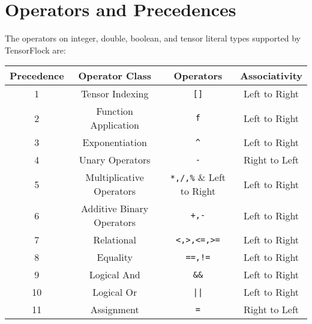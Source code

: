 \section{Operators and Precedences}%
\label{sec:operators_and_precedences}

The operators on integer, double, boolean, and tensor literal types
supported by TensorFlock are:

\begin{center}
\begin{tabular}{ |c|c|c|c| } 
 \hline
 Precedence & Operator Class & Operators & Associativity\\ 
 \hline
 1 & Tensor Indexing & \verb|[]| & Left to Right\\
 \hline
 2 & Function Application & \verb|f| & Left to Right \\
 \hline
 3 & Exponentiation & \verb|^| & Left to Right\\
 \hline
 4 & Unary Operators & \verb|-| & Right to Left \\
 \hline
 5 & Multiplicative Operators & \verb|*,/,%| & Left to Right\\
 \hline
 6 & Additive Binary Operators & \verb|+,-| & Left to Right\\
 \hline
 7 & Relational & \verb|<,>,<=,>=| & Left to Right\\
 \hline
 8 & Equality & \verb|==,!=| & Left to Right\\
 \hline
 9 & Logical And & \verb|&&| & Left to Right\\
 \hline
 10 & Logical Or & \verb!||! & Left to Right\\
 \hline
 11 & Assignment & \verb|=| & Right to Left\\
 \hline
\end{tabular}
\end{center}

